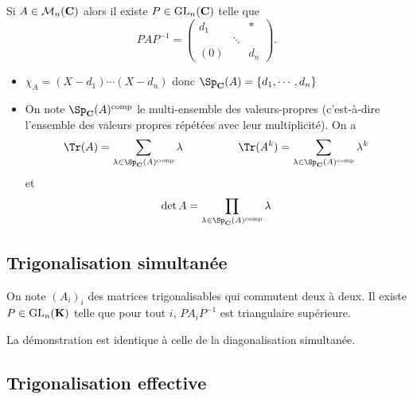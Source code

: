 \begin{rem}
    Si $A\in\mathcal M_n(\mathbf C)$ alors il existe $P\in\mathrm{GL}_n(\mathbf C)$ telle que \[
        PAP^{-1}= \begin{pmatrix}
            d_1 & & *\\
                &\ddots &\\
            (0)&&d_n
        \end{pmatrix}.
    \]
    \begin{itemize}
        \item $\chi_A=(X-d_1)\cdots (X-d_n)$ donc $\Sp_{\C}(A)=\{d_1, \cdots, d_n\}$
        \item On note $\Sp_{\C}(A)^{\text{comp}}$ le multi-ensemble des valeurs-propres (c'est-à-dire l'ensemble des valeurs propres répétées avec leur multiplicité). On a \[
                \Tr(A)=\sum_{\lambda\in\Sp_{\C}(A)^{\text{comp}}}\lambda\qquad \qquad \quad \Tr(A^k)=\sum_{\lambda\in\Sp_{\C}(A)^{\text{comp}}}\lambda^k
            \]
            et \[
                \det A=\prod_{\lambda\in\Sp_{\C}(A)^{\text{comp}}}\lambda
            \]
    \end{itemize}
\end{rem}

\subsection{Trigonalisation simultanée}

On note $(A_i)_i$ des matrices trigonalisables qui commutent deux à deux. Il existe $P\in\mathrm{GL}_n(\mathbf K)$ telle que pour tout $i$, $PA_iP^{-1}$ est triangulaire supérieure.

La démonstration est identique à celle de la diagonalisation simultanée.

\subsection{Trigonalisation effective}

